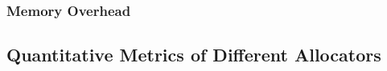 \subsubsection{Memory Overhead}
\label{sec:memory}

\subsection{Quantitative Metrics of Different Allocators}





